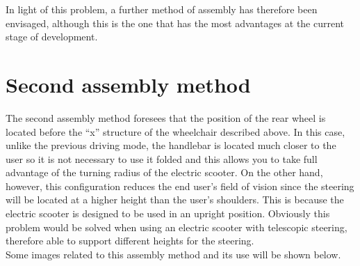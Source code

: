 \documentclass[binding=0.6cm,LaM,noexaminfo]{sapthesis}
\begin{document}
\noindent In light of this problem, a further method of assembly has therefore been envisaged, although this is the one that has the most advantages at the current stage of development.

\section{Second assembly method}
The second assembly method foresees that the position of the rear wheel is located before the “x” structure of the wheelchair described above. In this case, unlike the previous driving mode, the handlebar is located much closer to the user so it is not necessary to use it folded and this allows you to take full advantage of the turning radius of the electric scooter. On the other hand, however, this configuration reduces the end user's field of vision since the steering will be located at a higher height than the user's shoulders. This is because the electric scooter is designed to be used in an upright position. Obviously this problem would be solved when using an electric scooter with telescopic steering, therefore able to support different heights for the steering.\\

\noindent Some images related to this assembly method and its use will be shown below.
\end{document}
